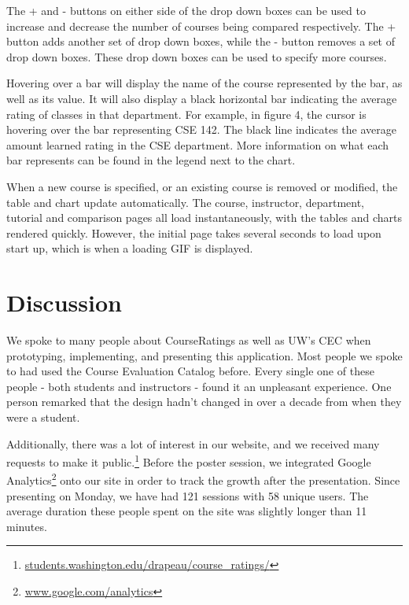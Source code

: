 \documentclass{chi2009}
\begin{document}
The + and - buttons on either side of the drop down boxes can be used to increase and decrease the number of courses being compared respectively. The + button adds another set of drop down boxes, while the - button removes a set of drop down boxes. These drop down boxes can be used to specify more courses.

Hovering over a bar will display the name of the course represented by the bar, as well as its value. It will also display a black horizontal bar indicating the average rating of classes in that department. For example, in figure 4, the cursor is hovering over the bar representing CSE 142. The black line indicates the average amount learned rating in the CSE department. More information on what each bar represents can be found in the legend next to the chart.

When a new course is specified, or an existing course is removed or modified, the table and chart update automatically. The course, instructor, department, tutorial and comparison pages all load instantaneously, with the tables and charts rendered quickly. However, the initial page takes several seconds to load upon start up, which is when a loading GIF is displayed.

\section{Discussion}

We spoke to many people about CourseRatings as well as UW's CEC when prototyping, implementing, and presenting this application. Most people we spoke to had used the Course Evaluation Catalog before. Every single one of these people - both students and instructors - found it an unpleasant experience. One person remarked that the design hadn't changed in over a decade from when they were a student.

Additionally, there was a lot of interest in our website, and we received many requests to make it public.\footnote{\href{students.washington.edu/drapeau/course_ratings/}{students.washington.edu/drapeau/course\_ratings/}} Before the poster session, we integrated Google Analytics\footnote{\href{www.google.com/analytics}{www.google.com/analytics}} onto our site in order to track the growth after the presentation. Since presenting on Monday, we have had 121 sessions with 58 unique users. The average duration these people spent on the site was slightly longer than 11 minutes.
\end{document}
